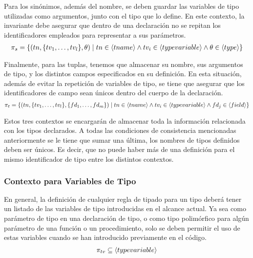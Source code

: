 Para los sinónimos, además del nombre, se deben guardar las variables de tipo utilizadas como argumentos, junto con el tipo que lo define.
En este contexto, la invariante debe asegurar que dentro de una declaración no se repitan los identificadores empleados para representar a sus parámetros.
\begin{gather*}
\pi_{s} =
\{
(tn, \{ tv_1, \ldots, tv_l \} , \theta) \mid 
tn \in \langle tname \rangle
\wedge
tv_i \in \langle typevariable \rangle
\wedge
\theta \in \langle type \rangle
\}
\end{gather*}

Finalmente, para las tuplas, tenemos que almacenar su nombre, sus argumentos de tipo, y los distintos campos especificados en su definición.
En esta situación, además de evitar la repetición de variables de tipo, se tiene que asegurar que los identificadores de campo sean únicos dentro del cuerpo de la declaración.
\begin{gather*}
\pi_{t} =
\{
(tn, \{ tv_1, \ldots, tv_l \}, \{ fd_1, \ldots, fd_m \} ) \mid
tn \in \langle tname \rangle 
\wedge
tv_i \in \langle typevariable \rangle
\wedge
fd_j \in \langle field \rangle
\}
\end{gather*}

Estos tres contextos se encargarán de almacenar toda la información relacionada con los tipos declarados.%
A todas las condiciones de consistencia mencionadas anteriormente se le tiene que sumar una última, los nombres de tipos definidos deben ser únicos.
Es decir, que no puede haber más de una definición para el mismo identificador de tipo entre los distintos contextos.

\subsubsection{Contexto para Variables de Tipo}

En general, la definición de cualquier regla de tipado para un tipo deberá tener un listado de las variables de tipo introducidas en el alcance actual.
Ya sea como parámetro de tipo en una declaración de tipo, o como tipo polimórfico para algún parámetro de una función o un procedimiento, solo se deben permitir el uso de estas variables cuando se han introducido previamente en el código.
\begin{gather*}
\pi_{tv} \subseteq \langle typevariable \rangle
\end{gather*}

